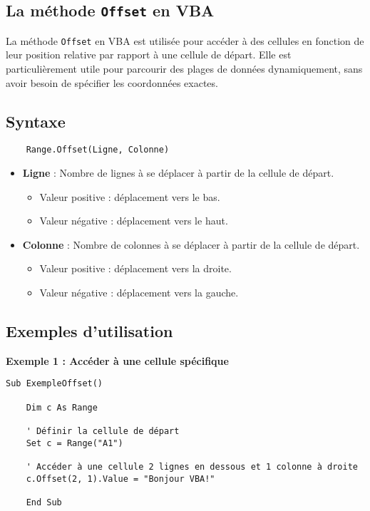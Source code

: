 \documentclass[a4paper,12pt]{report}
\begin{document}
\subsection{La méthode \texttt{Offset} en VBA}

La méthode \texttt{Offset} en VBA est utilisée pour accéder à des cellules en fonction de leur position relative par rapport à une cellule de départ. Elle est particulièrement utile pour parcourir des plages de données dynamiquement, sans avoir besoin de spécifier les coordonnées exactes.

\subsection*{Syntaxe}
\begin{verbatim}
	Range.Offset(Ligne, Colonne)
\end{verbatim}

\begin{itemize}
	\item \textbf{Ligne} : Nombre de lignes à se déplacer à partir de la cellule de départ.
	\begin{itemize}
		\item Valeur positive : déplacement vers le bas.
		\item Valeur négative : déplacement vers le haut.
	\end{itemize}
	\item \textbf{Colonne} : Nombre de colonnes à se déplacer à partir de la cellule de départ.
	\begin{itemize}
		\item Valeur positive : déplacement vers la droite.
		\item Valeur négative : déplacement vers la gauche.
	\end{itemize}
\end{itemize}
\newpage
\subsection*{Exemples d'utilisation}
\textbf{Exemple 1 : Accéder à une cellule spécifique}
\begin{lstlisting}[language=vbscript, caption={Accès à une cellule spécifique}]
	Sub ExempleOffset()
	
	Dim c As Range
	
	' Définir la cellule de départ
	Set c = Range("A1")
	
	' Accéder à une cellule 2 lignes en dessous et 1 colonne à droite
	c.Offset(2, 1).Value = "Bonjour VBA!"
	
	End Sub
\end{lstlisting}
\end{document}

